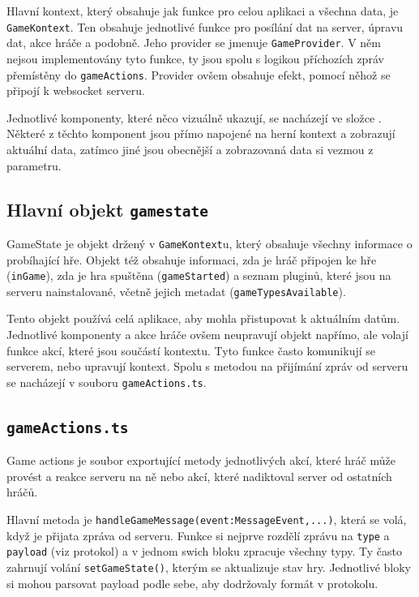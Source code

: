 Hlavní kontext, který obsahuje jak funkce pro celou aplikaci a všechna data, je \texttt{GameKontext}. Ten obsahuje jednotlivé funkce pro posílání dat na server, úpravu dat, akce hráče a podobně. Jeho provider se jmenuje \texttt{GameProvider}. V něm nejsou implementovány tyto funkce, ty jsou spolu s logikou příchozích zpráv přemístěny do \texttt{gameActions}. Provider ovšem obsahuje efekt, pomocí něhož se připojí k websocket serveru.

Jednotlivé komponenty, které něco vizuálně ukazují, se nacházejí ve složce . Některé z těchto komponent jsou přímo napojené na herní kontext a zobrazují aktuální data, zatímco jiné jsou obecnější a zobrazovaná data si vezmou z parametru.

\subsection{Hlavní objekt \texttt{gamestate}}
GameState je objekt držený v \texttt{GameKontext}u, který obsahuje všechny informace o probíhající hře. Objekt též obsahuje informaci, zda je hráč připojen ke hře (\texttt{inGame}), zda je hra spuštěna (\texttt{gameStarted}) a seznam pluginů, které jsou na serveru nainstalované, včetně jejich metadat (\texttt{gameTypesAvailable}).

Tento objekt používá celá aplikace, aby mohla přistupovat k aktuálním datům. Jednotlivé komponenty a akce hráče ovšem neupravují objekt napřímo, ale volají funkce akcí, které jsou součástí kontextu. Tyto funkce často komunikují se serverem, nebo upravují kontext. Spolu s metodou na přijímání zpráv od serveru se nacházejí v souboru \texttt{gameActions.ts}.

\subsection{\texttt{gameActions.ts}}
Game actions je soubor exportující metody jednotlivých akcí, které hráč může provést a reakce serveru na ně nebo akcí, které nadiktoval server od ostatních hráčů.

Hlavní metoda je \texttt{handleGameMessage(event:MessageEvent,...)}, která se volá, když je přijata zpráva od serveru. Funkce si nejprve rozdělí zprávu na \texttt{type} a \texttt{payload} (viz protokol) a v jednom swich bloku zpracuje všechny typy. Ty často zahrnují volání \texttt{setGameState()}, kterým se aktualizuje stav hry. Jednotlivé bloky si mohou parsovat payload podle sebe, aby dodržovaly formát v protokolu.

